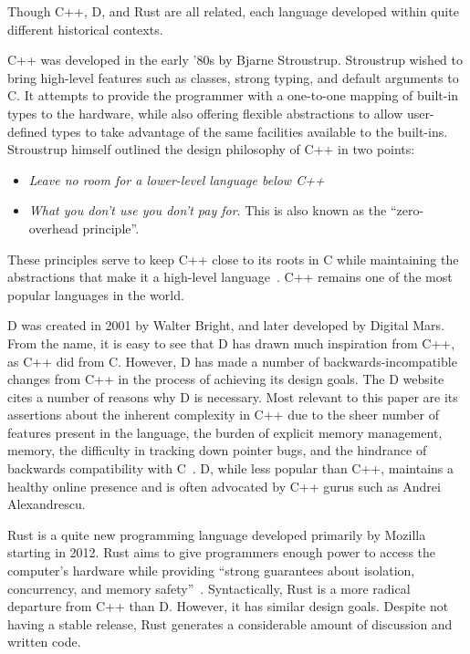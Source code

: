 \documentclass[draftcopy,nolof,nolot]{srpaper}
\begin{document}
Though C++, D, and Rust are all related, each language developed within quite
different historical contexts.

C++ was developed in the early '80s by Bjarne Stroustrup. Stroustrup wished to
bring high-level features such as classes, strong typing, and default arguments
to C. It attempts to provide the programmer with a one-to-one mapping of
built-in types to the hardware, while also offering flexible abstractions to
allow user-defined types to take advantage of the same facilities available to
the built-ins. Stroustrup himself outlined the design philosophy of C++ in two
points:

\begin{itemize}
\item \textit{Leave no room for a lower-level language below C++}
\item \textit{What you don't use you don't pay for}. This is also known as the
``zero-overhead principle''.
\end{itemize}

These principles serve to keep C++ close to its roots in C while maintaining
the abstractions that make it a high-level language~\cite{stroustrup2013the}.
C++ remains one of the most popular languages in the world.

D was created in 2001 by Walter Bright, and later developed by Digital Mars.
From the name, it is easy to see that D has drawn much inspiration from C++, as
C++ did from C. However, D has made a number of backwards-incompatible changes
from C++ in the process of achieving its design goals. The D website cites a
number of reasons why D is necessary. Most relevant to this paper are its
assertions about the inherent complexity in C++ due to the sheer number of
features present in the language, the burden of explicit memory management,
memory, the difficulty in tracking down pointer bugs, and the hindrance of
backwards compatibility with C~\cite{Doverview}. D, while less popular than
C++, maintains a healthy online presence and is often advocated by C++ gurus
such as Andrei Alexandrescu.

Rust is a quite new programming language developed primarily by Mozilla
starting in 2012. Rust aims to give programmers enough power to access the
computer's hardware while providing ``strong guarantees about isolation,
concurrency, and memory safety''~\cite{Matsakis:2014:RL:2663171.2663188}.
Syntactically, Rust is a more radical departure from C++ than D. However, it
has similar design goals. Despite not having a stable release, Rust generates
a considerable amount of discussion and written code.
\end{document}
